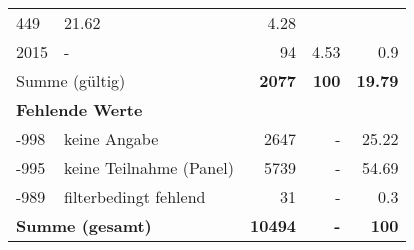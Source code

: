 \begin{longtable}{lXrrr}
       \num{449} &
       \num[round-mode=places,round-precision=2]{21,62} &
         \num[round-mode=places,round-precision=2]{4,28} \\

     2015 &
     \multicolumn{1}{X}{ -  } &


       \num{94} &
       \num[round-mode=places,round-precision=2]{4,53} &
         \num[round-mode=places,round-precision=2]{0,9} \\
     \midrule
     \multicolumn{2}{l}{Summe (gültig)} &
       \textbf{\num{2077}} &
     \textbf{100} &
       \textbf{\num[round-mode=places,round-precision=2]{19,79}} \\
     \multicolumn{5}{l}{\textbf{Fehlende Werte}}\\
       -998 &
       keine Angabe &
         \num{2647} &
        - &
         \num[round-mode=places,round-precision=2]{25,22} \\
       -995 &
       keine Teilnahme (Panel) &
         \num{5739} &
        - &
         \num[round-mode=places,round-precision=2]{54,69} \\
       -989 &
       filterbedingt fehlend &
         \num{31} &
        - &
         \num[round-mode=places,round-precision=2]{0,3} \\
     \midrule
     \multicolumn{2}{l}{\textbf{Summe (gesamt)}} &
          \textbf{\num{10494}} &
        \textbf{-} &
        \textbf{100} \\
     \bottomrule
     \end{longtable}
     

